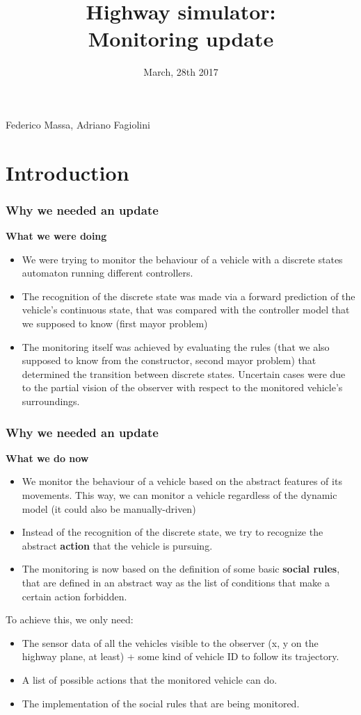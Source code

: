 \documentclass{beamer}
\title{Highway simulator: \\
Monitoring update}
\date{\small March, 28th 2017}
\begin{document}

{
\begin{frame}
\titlepage
\bigskip
\medskip
\centering\small Federico Massa, Adriano Fagiolini
\end{frame}}
\addtocounter{framenumber}{-1}

\section{Introduction}
\begin{frame}
\frametitle{Why we needed an update}
\textbf{What we were doing}
\begin{itemize}
	\item We were trying to monitor the behaviour of a vehicle
		  with a discrete states automaton running different
		  controllers.
 	\item The recognition of the discrete state was made via 
 		  a forward prediction of the vehicle's continuous state,
 		  that was compared with the controller model that we
 		  supposed to know (first mayor problem)
  	\item The monitoring itself was achieved by evaluating the
  		  rules (that we also supposed to know from the constructor, second 
  		  mayor problem) that determined the transition between
  		  discrete states. Uncertain cases were due to the 
  		  partial vision of the observer with respect to the 
  		  monitored vehicle's surroundings.
\end{itemize}
\end{frame}

\begin{frame}
\frametitle{Why we needed an update}
\textbf{What we do now}
\begin{itemize}
	\item We monitor the behaviour of a vehicle based on the
		  abstract features of its movements. This way, we can
		  monitor a vehicle regardless of the dynamic model 
		  (it could also be manually-driven)
 	\item Instead of the recognition of the discrete state,
 		  we try to recognize the abstract \textbf{action} 
 		  that the vehicle is pursuing. 
  	\item The monitoring is now based on the definition
  		  of some basic \textbf{social rules}, that 
  		  are defined in an abstract way as the list of
  		  conditions that make a certain action forbidden.
\end{itemize}

To achieve this, we only need:
\begin{itemize}
\item The sensor data of all the vehicles visible to the observer (x, y 
      on the highway plane, at least) + some kind of vehicle ID to 
      follow its trajectory.
\item A list of possible actions that the monitored vehicle can do.
\item The implementation of the social rules that are being monitored.
\end{itemize}
\end{frame}
\end{document}
